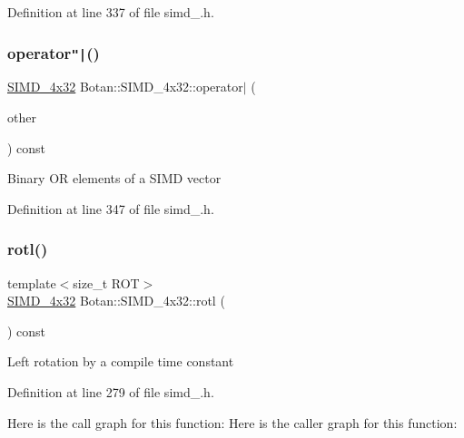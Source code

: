 Definition at line 337 of file simd\+\_.\+h.

\mbox{\label{class_botan_1_1_s_i_m_d__4x32_a71623f3567e53aa6fd8fa8c4cb05817b}} 
\subsubsection{\texorpdfstring{operator\texttt{"|}()}{operator|()}}
{\footnotesize\ttfamily \mbox{\hyperlink{class_botan_1_1_s_i_m_d__4x32}{S\+I\+M\+D\+\_\+4x32}} Botan\+::\+S\+I\+M\+D\+\_\+4x32\+::operator$\vert$ (\begin{DoxyParamCaption}\item[{const \mbox{\hyperlink{class_botan_1_1_s_i_m_d__4x32}{S\+I\+M\+D\+\_\+4x32}} \&}]{other }\end{DoxyParamCaption}) const\hspace{0.3cm}{\ttfamily [inline]}}

Binary OR elements of a S\+I\+MD vector 

Definition at line 347 of file simd\+\_.\+h.

\mbox{\label{class_botan_1_1_s_i_m_d__4x32_a2915571b60c9ce7250029593df2fcb44}} 
\subsubsection{\texorpdfstring{rotl()}{rotl()}}
{\footnotesize\ttfamily template$<$size\+\_\+t R\+OT$>$ \\
\mbox{\hyperlink{class_botan_1_1_s_i_m_d__4x32}{S\+I\+M\+D\+\_\+4x32}} Botan\+::\+S\+I\+M\+D\+\_\+4x32\+::rotl (\begin{DoxyParamCaption}{ }\end{DoxyParamCaption}) const\hspace{0.3cm}{\ttfamily [inline]}}

Left rotation by a compile time constant 

Definition at line 279 of file simd\+\_.\+h.

Here is the call graph for this function\+:
Here is the caller graph for this function\+:
\mbox{\label{class_botan_1_1_s_i_m_d__4x32_aecc836fad6eb953f5f339370d96b58f5}} 
